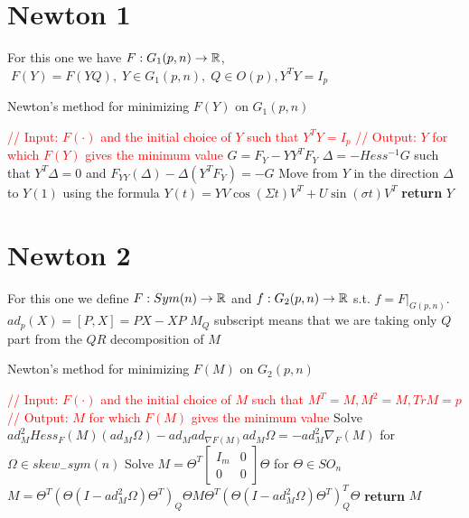\documentclass[11pt,a4paper]{report}
\begin{document}
\section{Newton 1}
For this one we have $F: G_1(p,n) \to \mathbb{R} $, $ \; F(Y) = F(YQ), \; Y \in G_1(p,n), \; Q \in O(p), Y^T Y = I_p$
\begin{algorithm}
\caption{Newton's method for minimizing $F(Y)$ on $G_1(p,n)$ }\label{alg:quotAlg}
    \begin{algorithmic}[1]
        \State \textcolor{red}{// Input: $F(\cdot)$ and the initial choice of $Y$ such that $Y^T Y = I_p$}
        \State \textcolor{red}{// Output: $Y$ for which $F(Y)$ gives the minimum value}
        \State $G = F_Y - Y Y^T F_Y$
        \State $\Delta = -Hess^{-1} G$ such that $Y^T \Delta = 0$ and $F_{YY}(\Delta) - \Delta(Y^T F_Y) = -G$
        \State
        \State Move from $Y$ in the direction $\Delta$ to $Y(1)$ using the formula 
        \State $Y(t) = Y V \cos(\Sigma t) V^T + U \sin(\sigma t) V^T$ 
        \EndWhile
        \State \textbf{return} $Y$
        \EndProcedure
    \end{algorithmic}
\end{algorithm}
\section{Newton 2}
For this one we define $F: Sym(n) \to \mathbb{R} $ and  $f: G_2(p,n) \to \mathbb{R}$ s.t. $f= F|_{G(p,n)}. \quad$
$ ad_p(X) = [P, X] = PX -  XP $
$M_Q$ subscript means that we are taking only $Q$ part from the $QR$ decomposition of $M$
\begin{algorithm}\label{newton2}
\caption{Newton's method for minimizing $F(M)$ on $G_2(p,n)$ }\label{alg:projAlg}
    \begin{algorithmic}[1]
        \State \textcolor{red}{// Input: $F(\cdot)$ and the initial choice of $M$ such that $M^T=M, M^2=M, TrM=p$}
        \State \textcolor{red}{// Output: $M$ for which $F(M)$ gives the minimum value}
        \State Solve
        \State $ad^2_{M} Hess_{F}(M)(ad_{M}\Omega) - ad_{M} ad_{\nabla F (M) } ad_{M} \Omega = -ad^2_{M} \nabla_{F}(M)$
        \State for $\Omega \in skew_-sym(n) $
        \State
        \State Solve 
        \State $M = \Theta^T \begin{bmatrix} I_m & 0 \\ 0 & 0 \end{bmatrix} \Theta$ 
        \State for $ \Theta \in SO_n$
        \State
        \State $ M = \Theta^T (\Theta( I - ad^2_{M} \Omega ) \Theta^T)_Q     \Theta M \Theta^T    (\Theta (I - ad^2_{M} \Omega) \Theta^T)_Q^T    \Theta$
        \EndWhile
        \State \textbf{return} $M$
        \EndProcedure
    \end{algorithmic}
\end{algorithm}
\end{document}
